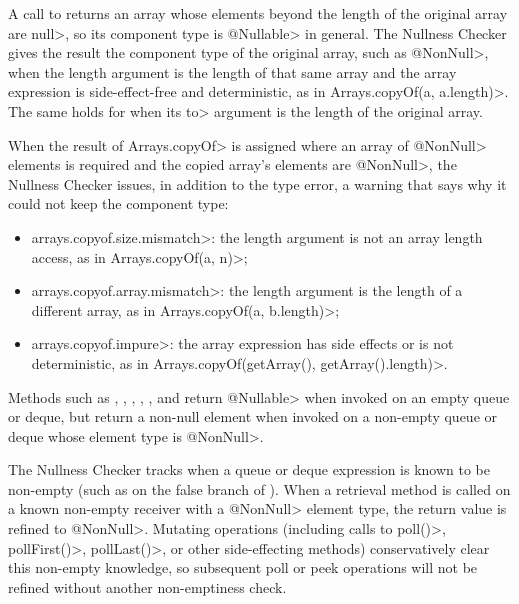 
A call to 
returns an array whose elements beyond the length of the original array are
\<null>, so its component type is \<@Nullable> in general.  The Nullness
Checker gives the result the component type of the original array, such as
\<@NonNull>, when the length argument is the length of that same array and the
array expression is side-effect-free and deterministic, as in
\<Arrays.copyOf(a, a.length)>.  The same holds for
when its \<to> argument is the length of the original array.

When the result of \<Arrays.copyOf> is assigned where an array of \<@NonNull>
elements is required and the copied array's elements are \<@NonNull>, the
Nullness Checker issues, in addition to the type error, a warning that says
why it could not keep the component type:
\begin{itemize}
\item \<arrays.copyof.size.mismatch>:  the length argument is not an array
  length access, as in \<Arrays.copyOf(a, n)>;
\item \<arrays.copyof.array.mismatch>:  the length argument is the length of a
  different array, as in \<Arrays.copyOf(a, b.length)>;
\item \<arrays.copyof.impure>:  the array expression has side effects or is not
  deterministic, as in \<Arrays.copyOf(getArray(), getArray().length)>.
\end{itemize}



Methods such as ,
,
,
,
, and
 return
\<@Nullable> when invoked on an empty queue or deque, but return a non-null
element when invoked on a non-empty queue or deque whose element type is \<@NonNull>.

The Nullness Checker tracks when a queue or deque expression is known to be
non-empty (such as on the false branch of
).
When a retrieval method is called on a known non-empty receiver with a
\<@NonNull> element type, the return value is refined to \<@NonNull>.
Mutating operations (including calls to \<poll()>, \<pollFirst()>, \<pollLast()>,
or other side-effecting methods) conservatively clear this non-empty knowledge,
so subsequent poll or peek operations will not be refined without another
non-emptiness check.


